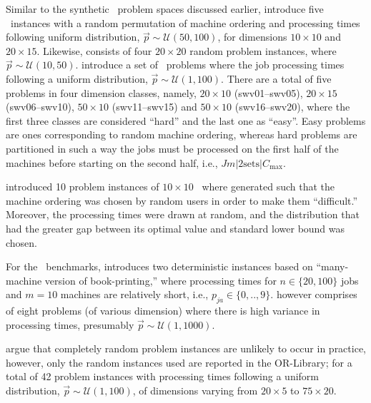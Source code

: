 Similar to the synthetic \JSP\ problem spaces discussed earlier, \citet{orlib_abz} introduce five \JSP\ instances with a random permutation of machine ordering and processing times following uniform distribution,  $\vec{p}\sim\mathcal{U}(50,100)$, for  dimensions $10\times10$ and $20\times15$. Likewise, \citet{orlib_yn} consists of four $20\times20$ random problem instances, where $\vec{p}\sim\mathcal{U}(10,50)$.
\citet{orlib_swv} introduce a set of \JSP\ problems where the job processing times following a uniform distribution, $\vec{p}\sim\mathcal{U}(1,100)$. There are a total of  five problems in four dimension classes, namely, $20\times10$ (swv01--swv05), $20\times15$ (swv06--swv10), $50\times10$ (swv11--swv15) and $50\times10$ (swv16--swv20), where the first three classes are considered ``{hard}'' and the last one as ``{easy}''. Easy problems are ones corresponding to random machine ordering, whereas hard problems are partitioned in such a way the jobs must be processed on the first half of the machines before starting on the second half, i.e., $Jm|\text{2sets}|C_{\max}$.

\citet{orlib_orb} introduced 10 problem instances of $10\times10$ \JSP\ where generated such that the machine ordering was chosen by random users in order to make them ``difficult.'' Moreover, the processing times were drawn at random, and the distribution that had the greater gap between its optimal value and standard lower bound was chosen. 

For the \FSP\  benchmarks, \citet{orlib_hel} introduces two deterministic instances based on ``many-machine version of book-printing,'' where processing times for $n\in\{20,100\}$ jobs and $m=10$ machines are relatively short, i.e., $p_{ja}\in\{0,..,9\}$. \citet{orlib_car} however comprises of eight problems (of various dimension) where there is high variance in processing times, presumably $\vec{p}\sim\mathcal{U}(1,1000)$. 

\citet{orlib_rec} argue that completely random problem instances are unlikely to occur in practice, however, only the random instances used are reported in the OR-Library; for a total of 42 problem instances with processing times following a uniform distribution, $\vec{p}\sim\mathcal{U}(1,100)$, of dimensions varying from $20\times5$ to $75\times20$. 


